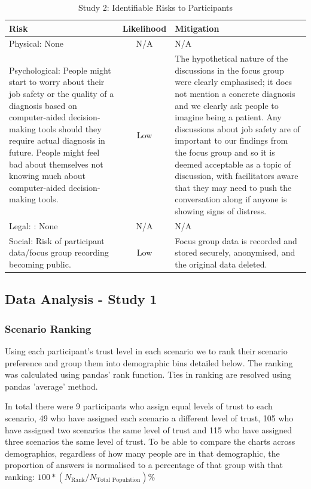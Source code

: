 \documentclass[manuscript,screen,review]{acmart}
\begin{document}
\begin{table}[h]
\begin{center}
\begin{tabular}{ | p{6cm} | c | p{6cm} |}
\hline
 Risk & Likelihood & Mitigation \\
 \hline
 \hline
 Physical: None & N/A & N/A \\
 \hline
 Psychological: People might start to worry about their job safety or the quality of a diagnosis based on computer-aided decision-making tools should they require actual diagnosis in future. People might feel bad about themselves not knowing much about computer-aided decision-making tools. & Low & The hypothetical nature of the discussions in the focus group were clearly emphasised; it does not mention a concrete diagnosis and we clearly ask people to imagine being a patient. Any discussions about job safety are of important to our findings from the focus group and so it is deemed acceptable as a topic of discussion, with facilitators aware that they may need to push the conversation along if anyone is showing signs of distress. \\
 \hline
 Legal: : None & N/A & N/A \\
 \hline
Social: Risk of participant data/focus group recording becoming public. & Low & Focus group data is recorded and stored securely, anonymised, and the original data deleted.\\
\hline
\end{tabular}
\caption{Study 2: Identifiable Risks to Participants}
\label{table:study2_risks}
\end{center}
\end{table}


\subsection{Data Analysis - Study 1}
\subsubsection{Scenario Ranking}

Using each participant's trust level in each scenario we to rank their scenario preference and group them into demographic bins detailed below. The ranking was calculated using pandas' rank function. Ties in ranking are resolved using pandas 'average' method\cite{mckinney-proc-scipy-2010}.

In total there were 9 participants who assign equal levels of trust to each scenario, 49 who have assigned each scenario a different level of trust, 105 who have assigned two scenarios the same level of trust and 115 who have assigned three scenarios the same level of trust. To be able to compare the charts across demographics, regardless of how many people are in that demographic, the proportion of answers is normalised to a percentage of that group with that ranking: $100*(N_{\textrm{Rank}}/N_{\textrm{Total Population}})$\%
\end{document}
